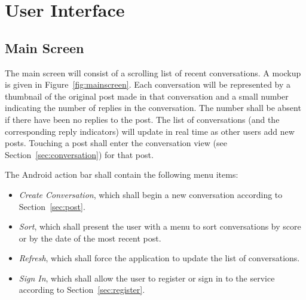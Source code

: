 \documentclass[11pt]{scrartcl}
\let\stdsection\section
\renewcommand\section{\newpage\stdsection}
\begin{document}
\appendix

\section{User Interface}
    \subsection{Main Screen}
        The main screen will consist of a scrolling list of recent conversations.
        A mockup is given in Figure~\ref{fig:mainscreen}.
        Each conversation will be represented by a thumbnail of the original post made in that conversation and a small number indicating the number of replies in the conversation.
        The number shall be absent if there have been no replies to the post.
        The list of conversations (and the corresponding reply indicators) will update in real time as other users add new posts.
        Touching a post shall enter the conversation view (see Section~\ref{sec:conversation}) for that post.

        The Android action bar shall contain the following menu items:

        \begin{itemize}
            \item \emph{Create Conversation}, which shall begin a new conversation according to Section~\ref{sec:post}.
            \item \emph{Sort}, which shall present the user with a menu to sort conversations by score or by the date of the most recent post.
            \item \emph{Refresh}, which shall force the application to update the list of conversations.
            \item \emph{Sign In}, which shall allow the user to register or sign in to the service according to Section~\ref{sec:register}.
        \end{itemize}
\end{document}
